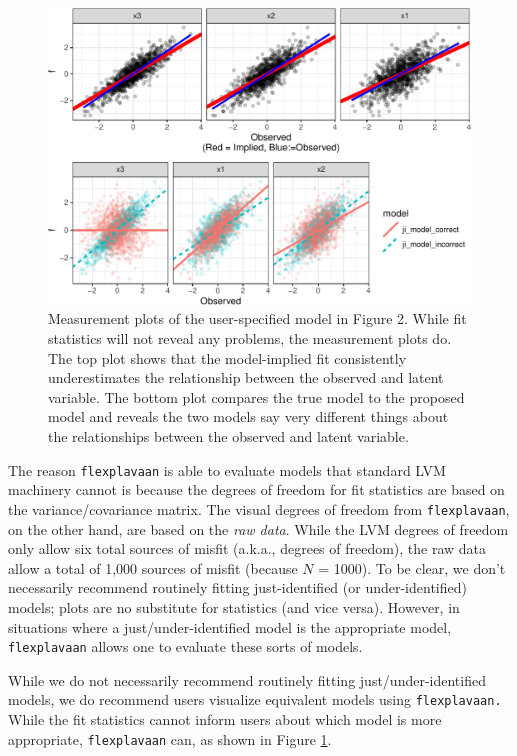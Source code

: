 \documentclass[
  english,
  man]{apa6}
\begin{document}
\begin{figure}

{\centering \includegraphics[width=0.9\linewidth]{flexplavaan_draft_files/figure-latex/equivalentmodels-1} 

}

\caption{Measurement plots of the user-specified model in Figure 2. While fit statistics will not reveal any problems, the measurement plots do. The top plot shows that the model-implied fit consistently underestimates the relationship between the observed and latent variable. The bottom plot compares the true model to the proposed model and reveals the two models say very different things about the relationships between the observed and latent variable.}\label{fig:equivalentmodels}
\end{figure}

The reason \texttt{flexplavaan} is able to evaluate models that standard LVM machinery cannot is because the degrees of freedom for fit statistics are based on the variance/covariance matrix. The visual degrees of freedom from \texttt{flexplavaan}, on the other hand, are based on the \emph{raw data}. While the LVM degrees of freedom only allow six total sources of misfit (a.k.a., degrees of freedom), the raw data allow a total of 1,000 sources of misfit (because \(N\) = 1000). To be clear, we don't necessarily recommend routinely fitting just-identified (or under-identified) models; plots are no substitute for statistics (and vice versa). However, in situations where a just/under-identified model is the appropriate model, \texttt{flexplavaan} allows one to evaluate these sorts of models.

While we do not necessarily recommend routinely fitting just/under-identified models, we do recommend users visualize equivalent models using \texttt{flexplavaan.} While the fit statistics cannot inform users about which model is more appropriate, \texttt{flexplavaan} can, as shown in Figure \ref{fig:equivalentmodels}.
\end{document}
